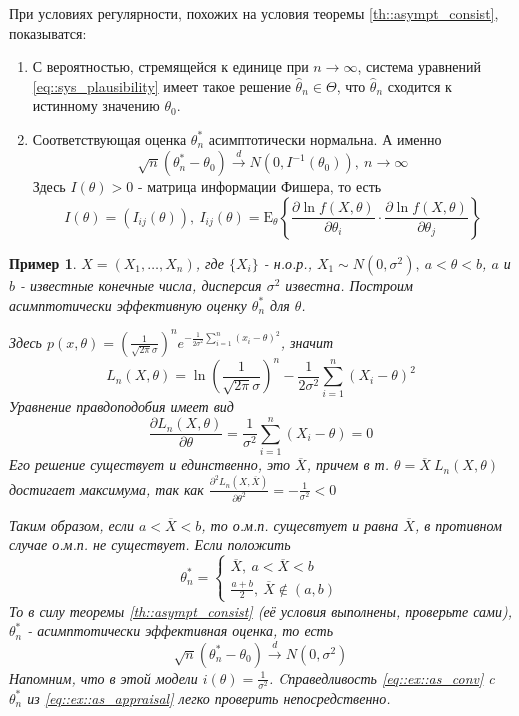 \documentclass[12pt]{article}
\newtheorem*{example}{Пример}
\theoremstyle{basic_theorem}
\theoremstyle{name_theorem}
\def\E{
    \mathrm{E}
}
\begin{document}
    При условиях регулярности, похожих на условия теоремы \ref{th::asympt_consist},
    показыватся:
    \begin{enumerate}
        \item С вероятностью, стремящейся к единице при $n \rightarrow \infty$,
            система уравнений \eqref{eq::sys_plausibility} имеет такое решение $\widehat{\theta}_n\in\Theta$,
            что $\widehat{\theta}_n$ сходится к истинному значению $\theta_0$.
        \item Соответствующая оценка $\theta^*_n$ асимптотически нормальна. А именно
         $$\sqrt{n}(\theta^*_n - \theta_0) \xrightarrow{d} N(0, I^{-1}(\theta_0)),\ n\rightarrow\infty$$
         Здесь $I(\theta) > 0$ - матрица информации Фишера, то есть
         $$I(\theta) = (I_{ij}(\theta)),\ I_{ij}(\theta) = \E_\theta \left\{\frac{\partial \ln f(X, \theta)}{\partial\theta_i} \cdot \frac{\partial\ln f(X, \theta)}{\partial\theta_j}\right\}$$ 
    \end{enumerate}
\begin{example}
        $X = (X_1, \ldots, X_n)$, где $\{X_i\}$ - н.о.р., $X_1 \sim N(0, \sigma^2),\ a < \theta < b$,
        $a$ и $b$ - известные конечные числа, дисперсия $\sigma^2$ известна.
        Построим асимптотически эффективную оценку $\theta^*_n$ для $\theta$.

        Здесь $p(x, \theta) = \left(\frac{1}{\sqrt{2\pi} \sigma}\right)^ne^{-\frac{1}{2\sigma^2}\sum_{i=1}^n (x_i-\theta)^2}$,
        значит
        $$L_n(X, \theta) = \ln\left(\frac{1}{\sqrt{2\pi}\sigma}\right)^n - \frac{1}{2\sigma^2}\sum_{i=1}^n(X_i-\theta)^2$$
        Уравнение правдоподобия имеет вид
        $$\frac{\partial L_n(X, \theta)}{\partial\theta} = \frac{1}{\sigma^2}\sum_{i=1}^n(X_i - \theta) = 0$$
        Его решение существует и единственно, это $\overline{X}$, причем
        в т. $\theta = \overline{X}\ L_n(X,\theta)$ достигает максимума,
        так как $\frac{\partial^2 L_n(X, \overline{X})}{\partial\theta^2} = - \frac{1}{\sigma^2} < 0$

        Таким образом, если $a < \overline{X} < b$, то о.м.п. сущесвтует и равна $\overline{X}$,
        в противном случае о.м.п. не существует. Если положить
        \begin{equation}
            \label{eq::ex::as_appraisal}
            \theta^*_n = \begin{cases}
                \overline{X},\ a < \overline{X} < b \\
                \frac{a+b}{2},\ \overline{X} \notin (a,b) 
            \end{cases}
        \end{equation}
        То в силу теоремы \ref{th::asympt_consist} (её условия
        выполнены, проверьте сами), $\theta^*_n$ - асимптотически эффективная оценка, то есть
        \begin{equation}
            \label{eq::ex::as_conv}
            \sqrt{n}(\theta^*_n - \theta_0) \xrightarrow{d} N(0, \sigma^2)
        \end{equation}
        Напомним, что в этой модели $i(\theta) = \frac{1}{\sigma^2}$.
        Cправедливость \eqref{eq::ex::as_conv} c $\theta^*_n$
        из \eqref{eq::ex::as_appraisal} легко проверить непосредственно.
\end{example}
\end{document}

